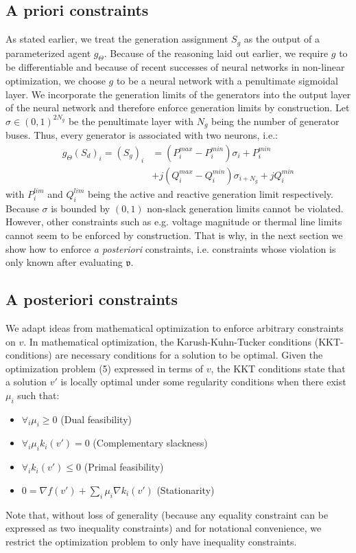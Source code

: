 \subsection{A priori constraints}
As stated earlier, we treat the generation assignment $S_g$ as the output of a parameterized agent $g_\Theta$. Because of the reasoning laid out earlier, we require $g$ to be differentiable and because of recent successes of neural networks in non-linear optimization, we choose $g$ to be a neural network with a penultimate sigmoidal layer. We incorporate the generation limits of the generators into the output layer of the neural network and therefore enforce generation limits by construction. Let $\sigma \in (0,1)^{2N_g}$ be the penultimate layer with $N_g$ being the number of generator buses. Thus, every generator is associated with two neurons, i.e.:
\begin{align*}
g_\Theta(S_d)_i = (S_g)_i &= (P_i^{max} - P_i^{min})\sigma_i + P_i^{min}\\
 &+ j(Q_i^{max} - Q_i^{min})\sigma_{i+N_g}  + jQ_i^{min}
\end{align*}
with $P^{lim}_i$ and $Q_i^{lim}$ being the active and reactive generation limit respectively. Because $\sigma$ is bounded by $(0,1)$ non-slack generation limits cannot be violated. However, other constraints such as e.g. voltage magnitude or thermal line limits cannot seem to be enforced by construction. That is why, in the next section we show how to enforce \emph{a posteriori} constraints, i.e. constraints whose violation is only known after evaluating $\mathfrak{v}$.


\subsection{A posteriori constraints}
We adapt ideas from mathematical optimization to enforce arbitrary constraints on $v$. In mathematical optimization, the Karush-Kuhn-Tucker conditions (KKT-conditions) are necessary conditions for a solution to be optimal. Given the optimization problem (5) expressed in terms of $v$, the KKT conditions state that a solution $v'$ is locally optimal under some regularity conditions when there exist $\mu_i$ such that:
\begin{itemize}
\item $\forall_i \mu_i \geq 0$ (Dual feasibility)
\item $\forall_i \mu_i k_i(v') = 0$ (Complementary slackness)
\item $\forall_i k_i(v') \leq 0$ (Primal feasibility)
\item $0 =\nabla f(v') + \sum_i \mu_i \nabla k_i(v')$ (Stationarity)
\end{itemize}
Note that, without loss of generality (because any equality constraint can be expressed as two inequality constraints) and for notational convenience, we restrict the optimization problem to only have inequality constraints.

